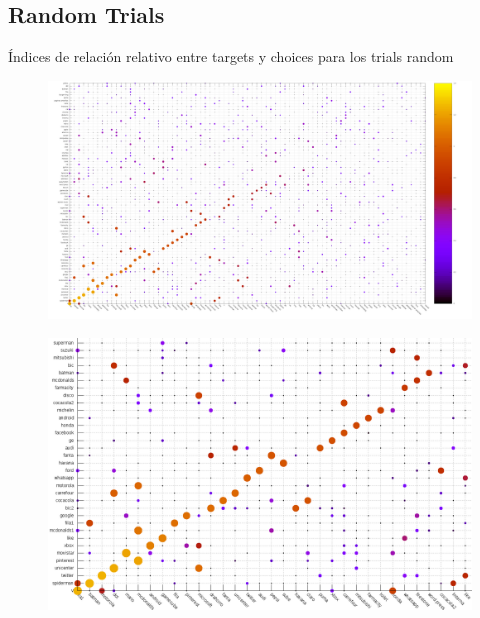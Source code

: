 \documentclass{beamer}
\begin{document}
\subsection{Random Trials}

\begin{frame}
\centering
Índices de relación relativo entre targets y choices para los trials random
\begin{figure}[h]
 \centering
  \begin{minipage}[c]{1\textwidth}
	\centering	
	\includegraphics[scale=0.13]{random.png}
  \end{minipage}
\end{figure}
\end{frame}

\begin{frame}
\begin{figure}[h]
 \centering
  \begin{minipage}[c]{1\textwidth}
	\centering	
	\includegraphics[scale=0.32]{randomx.png}
  \end{minipage}
\end{figure}
\end{frame}
\end{document}
